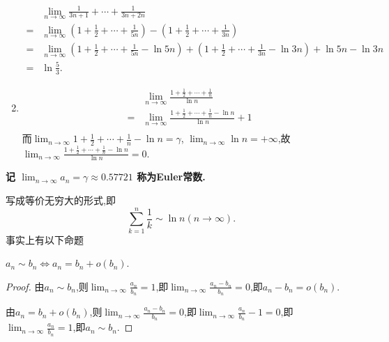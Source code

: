 \begin{example}
\begin{solution}
\begin{enumerate}
                  \begin{align*}
                        & \lim_{n \to \infty} \frac{1}{3n+1} + \cdots + \frac{1}{3n+2n}                                                                                               \\
                      = & \lim_{n \to \infty} \left( 1 + \frac12 + \cdots + \frac1{5n} \right) - \left( 1 + \frac12 + \cdots + \frac1{3n} \right)                                     \\
                      = & \lim_{n \to \infty} \left( 1 + \frac12 + \cdots + \frac1{5n} - \ln 5n \right) + \left( 1 + \frac12 + \cdots + \frac1{3n} - \ln 3n \right) + \ln 5n - \ln 3n \\
                      = & \ln \frac53.
                  \end{align*}
            \item
                  \begin{align*}
                        & \lim_{n \to \infty} \frac{ 1 + \frac12 + \cdots + \frac1n}{\ln n}             \\
                      = & \lim_{n \to \infty} \frac{ 1 + \frac12 + \cdots + \frac1n - \ln n}{\ln n} + 1 \\
                  \end{align*}
                  而$\lim_{n \to \infty} { 1 + \frac12 + \cdots + \frac1n - \ln n} = \gamma$, $\lim_{n \to \infty} \ln n = +\infty$,故$\lim_{n \to \infty} \frac{ 1 + \frac12 + \cdots + \frac1n - \ln n}{\ln n} = 0$.

        \end{enumerate}
    \end{solution}
\end{example}

\textbf{记 $\lim_{n \to \infty} a_n = \gamma \approx 0.57721$ 称为Euler常数.}

写成等价无穷大的形式,即$$\sum_{k=1}^{n} \frac1k \sim \ln n (n \to \infty).$$
事实上有以下命题
\begin{proposition}
    $a_n \sim b_n \Leftrightarrow a_n = b_n + o(b_n)$.
\end{proposition}

\begin{proof}
    由$a_n \sim b_n$,则$\lim_{n \to \infty} \frac{a_n}{b_n} = 1$,即$\lim_{n \to \infty} \frac{a_n - b_n}{b_n} = 0$,即$a_n - b_n = o(b_n)$.

    由$a_n = b_n + o(b_n)$,则$\lim_{n \to \infty} \frac{a_n - b_n}{b_n} = 0$,即$\lim_{n \to \infty} \frac{a_n}{b_n} - 1 = 0$,即$\lim_{n \to \infty} \frac{a_n}{b_n} = 1$,即$a_n \sim b_n$.
\end{proof}

